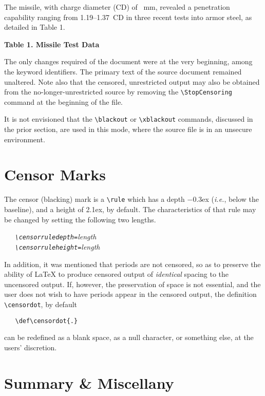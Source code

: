 \documentclass{article}
\begin{document}
{The {\Missile} missile, with charge diameter (CD) of
{\Size}~mm, revealed a penetration capability ranging
from 1.19--1.37~CD in three recent tests into armor
steel, as detailed in Table 1.

\begin{table}[ht]
\begin{center}
\textbf{Table 1. {\Missile} Missile Test Data}\\
{\TableOne}
\end{center}
\end{table}

\hrulefill

}

The only changes required of the document were at the very beginning,
among the keyword identifiers.  The primary text of the source document
remained unaltered.  Note also that the censored, unrestricted output
may also be obtained from the no-longer-unrestricted source by removing
the \verb|\StopCensoring| command at the beginning of the file.

It is not envisioned that the \verb|\blackout| or \verb|\xblackout|
commands, discussed in the prior section, are used in this mode, where
the source file is in an unsecure environment.

\section{Censor Marks}

The censor (blacking) mark is a \verb|\rule| which has a depth
\(-\)0.3ex (\textit{i.e.}, below the baseline), and a height of 2.1ex,
by default.  The characteristics of that rule may be changed by setting
the following two lengths.

\itshape
\verb|   \censorruledepth=|length\\
\verb|   \censorruleheight=|length
\upshape

In addition, it was mentioned that periods are not censored, so as to
preserve the ability of \LaTeX{} to produce censored output of
\textit{identical} spacing to the uncensored output.  If, however, the
preservation of space is not essential, and the user does not wish to
have periods appear in the censored output, the definition
\verb|\censordot|, by default

\verb|   \def\censordot{.}|

can be redefined as a blank space, as a null character, or something
else, at the users' discretion.

\section{Summary \& Miscellany}
\end{document}
